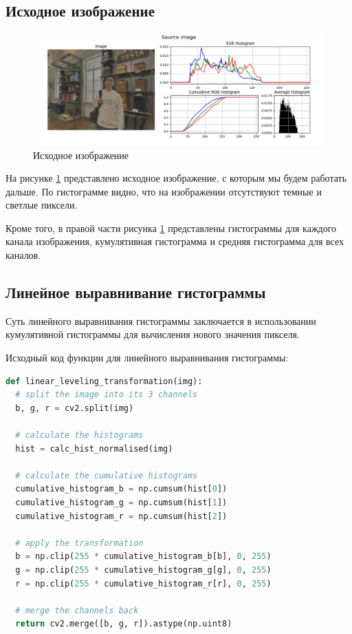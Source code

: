 \subsection{Исходное изображение}

\begin{figure}[H]
    \centering
    \includegraphics[width=\textwidth]{../results/Source image.png}
    \caption{Исходное изображение}
    \label{fig:source}
\end{figure}

На рисунке \ref{fig:source} представлено исходное изображение, с которым мы будем работать дальше. По гистограмме видно, что на изображении отсутствуют темные и светлые пиксели. 

Кроме того, в правой части рисунка \ref{fig:source} представлены гистограммы для каждого канала изображения, кумулятивная гистограмма и средняя гистограмма для всех каналов.

\subsection{Линейное выравнивание гистограммы}

Суть линейного выравнивания гистограммы заключается в использовании кумулятивной гистограммы для вычисления нового значения пикселя.

Исходный код функции для линейного выравнивания гистограммы:

\begin{lstlisting}[language=Python]
def linear_leveling_transformation(img):
  # split the image into its 3 channels
  b, g, r = cv2.split(img)

  # calculate the histograms
  hist = calc_hist_normalised(img)

  # calculate the cumulative histograms
  cumulative_histogram_b = np.cumsum(hist[0]) 
  cumulative_histogram_g = np.cumsum(hist[1])
  cumulative_histogram_r = np.cumsum(hist[2])

  # apply the transformation
  b = np.clip(255 * cumulative_histogram_b[b], 0, 255)
  g = np.clip(255 * cumulative_histogram_g[g], 0, 255)
  r = np.clip(255 * cumulative_histogram_r[r], 0, 255)

  # merge the channels back
  return cv2.merge([b, g, r]).astype(np.uint8)
\end{lstlisting}

